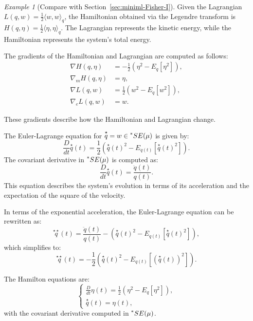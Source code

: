 \documentclass[axioms,article,submit,pdftex,moreauthors]{Definitions/mdpi}
\theoremstyle{plain}
\theoremstyle{remark}
\newtheorem{myexample}{Example}
\begin{document}
\begin{myexample}[Compare with Section~\ref{sec:miniml-Fisher-I}]
    Given the Lagrangian \( L(q, w) = \frac{1}{2} \langle w, w \rangle_q \), the Hamiltonian obtained via the Legendre transform is \( H(q, \eta) = \frac{1}{2} \langle \eta, \eta \rangle_q \).
The Lagrangian represents the kinetic energy, while the Hamiltonian represents the system's total energy.

The gradients of the Hamiltonian and Lagrangian are computed as follows:
\begin{align*}
\nabla H(q, \eta) &= - \frac{1}{2} (\eta^2 - E_q[\eta^2]), \\
\nabla_m H(q, \eta) &= \eta, \\
\nabla L(q, w) &= \frac{1}{2} (w^2 - E_q[w^2]), \\
\nabla_e L(q, w) &= w.
    \end{align*}

These gradients describe how the Hamiltonian and Lagrangian change.

The Euler-Lagrange equation for \( \overset{\star}{q} = w \in \prescript{*}{}S E (\mu) \) is given by:
\begin{equation*} 
\frac{D}{dt} \overset{\star}{q}(t) = \frac{1}{2} (\overset{\star}{q}(t)^2 - E_{q(t)}[\overset{\star}{q}(t)^2]).
\end{equation*} 
The covariant derivative in \( \prescript{*}{}S E (\mu) \) is computed as:
\begin{equation*} 
\frac{D}{dt} \overset{\star}{q}(t) = \frac{\ddot{q}(t)}{q(t)}.
\end{equation*} 
This equation describes the system's evolution in terms of its acceleration and the expectation of the square of the velocity.

In terms of the exponential acceleration, the Euler-Lagrange equation can be rewritten as:
\begin{equation*} 
\overset{\star\star}{q}(t) = \frac{\ddot{q}(t)}{q(t)} - \left( \overset{\star}{q}(t)^2 - E_{q(t)}[\overset{\star}{q}(t)^2] \right),
\end{equation*}
which simplifies to:
\begin{equation*} 
\overset{\star\star}{q}(t) = -\frac{1}{2} \left( \overset{\star}{q}(t)^2 - E_{q(t)}[(\overset{\star}{q}(t))^2] \right).
\end{equation*} 

The Hamilton equations are:
\begin{equation*} 
\begin{cases}
\frac{D}{dt} \eta(t) = \frac{1}{2} \left( \eta^2 - E_q[\eta^2] \right), \\
\overset{\star}{q}(t) = \eta(t),
\end{cases}
\end{equation*} 
with the covariant derivative computed in \( \prescript{*}{}S E (\mu) \).


\end{myexample}
\end{document}
